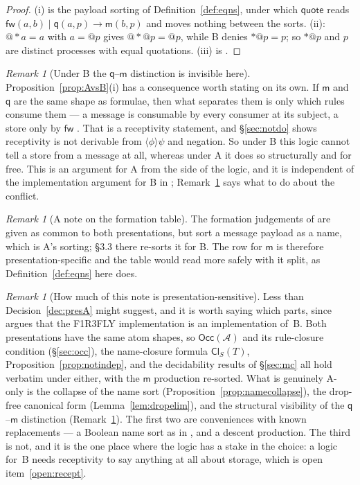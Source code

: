 \documentclass[11pt]{article}
\makeatletter
\theoremstyle{plain}
\theoremstyle{definition}
\theoremstyle{remark}
\newtheorem{remark}[theorem]{Remark}
\newcommand{\quo}[1]{@#1}
\newcommand{\drp}[1]{{*}#1}
\newcommand{\mm}{\mathsf{m}}
\newcommand{\fw}{\mathsf{fw}}
\newcommand{\qq}{\mathsf{q}}
\newcommand{\red}{\longrightarrow}
\newcommand{\may}[1]{\langle #1 \rangle}
\newcommand{\Occ}{\mathsf{Occ}}
\newcommand{\Cl}{\mathsf{Cl}}
\newcommand{\Atm}{\mathcal{A}}
\makeatother
\begin{document}
\begin{proof}
(i) is the payload sorting of Definition~\ref{def:eqns}, under which
$\mathsf{quote}$ reads $\fw(a,b) \mid \qq(a,p) \red \mm(b,p)$ and moves
nothing between the sorts. (ii): $\quo{\drp{a}} = a$ with $a = \quo{p}$ gives
$\quo{\drp{\quo{p}}} = \quo{p}$, while B denies $\drp{\quo{p}} = p$; so
$\drp{\quo{p}}$ and $p$ are distinct processes with equal quotations. (iii)
is \cite[\S4]{rhocomb3}.
\end{proof}

\begin{remark}[Under B the $\qq$--$\mm$ distinction is invisible here]
\label{rem:Binvisible}
Proposition~\ref{prop:AvsB}(i) has a consequence worth stating on its own. If
$\mm$ and $\qq$ are the same shape as formulae, then what separates them is
only which rules consume them --- a message is consumable by every consumer at
its subject, a store only by $\fw$ \cite[Rem.~3.7]{rhocomb3}. That is a
receptivity statement, and \S\ref{sec:notdo} shows receptivity is not
derivable from $\may{\phi}\psi$ and negation. So under B this logic cannot
tell a store from a message at all, whereas under A it does so structurally
and for free. This is an argument for A from the side of the logic, and it is
independent of the implementation argument for B in \cite[\S4]{rhocomb3};
Remark~\ref{rem:whichway} says what to do about the conflict.
\end{remark}

\begin{remark}[A note on the formation table]
\label{rem:formtable}
The formation judgements of \cite[\S3.2]{rhocomb3} are given as common to both
presentations, but sort a message payload as a name, which is A's sorting;
\S3.3 there re-sorts it for B. The row for $\mm$ is therefore
presentation-specific and the table would read more safely with it split, as
Definition~\ref{def:eqns} here does.
\end{remark}

\begin{remark}[How much of this note is presentation-sensitive]
\label{rem:whichway}
Less than Decision~\ref{dec:presA} might suggest, and it is worth saying which
parts, since \cite[\S4]{rhocomb3} argues that the F1R3FLY implementation is an
implementation of~B. Both presentations have the same atom shapes, so
$\Occ(\Atm)$ and its rule-closure condition (\S\ref{sec:occ}), the name-closure
formula $\Cl_{S}(T)$, Proposition~\ref{prop:notindep}, and the decidability
results of \S\ref{sec:mc} all hold verbatim under either, with the $\mm$
production re-sorted. What is genuinely A-only is the collapse of the name sort
(Proposition~\ref{prop:namecollapse}), the drop-free canonical form
(Lemma~\ref{lem:dropelim}), and the structural visibility of the $\qq$--$\mm$
distinction (Remark~\ref{rem:Binvisible}). The first two are conveniences with
known replacements --- a Boolean name sort as in \cite{f1r3space}, and a
descent production. The third is not, and it is the one place where the logic
has a stake in the choice: a logic for~B needs receptivity to say anything at
all about storage, which is open item~\ref{open:recept}.
\end{remark}
\end{document}
